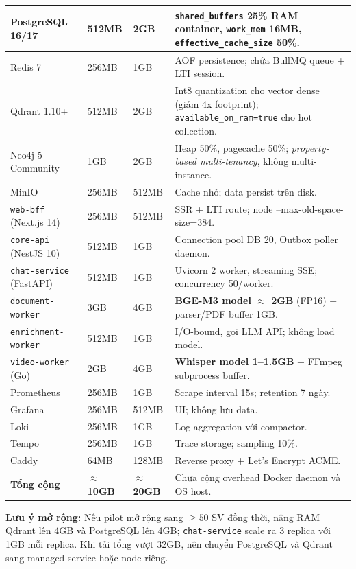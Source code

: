 \begin{longtable}{|p{3.7cm}|p{1.5cm}|p{1.8cm}|p{6cm}|}
PostgreSQL 16/17 & 512MB & 2GB
    & \texttt{shared\_buffers} 25\% RAM container, \texttt{work\_mem}
      16MB, \texttt{effective\_cache\_size} 50\%. \\
\hline
Redis 7 & 256MB & 1GB
    & AOF persistence; chứa BullMQ queue + LTI session. \\
\hline
Qdrant 1.10+ & 512MB & 2GB
    & Int8 quantization cho vector dense (giảm 4x footprint);
      \texttt{available\_on\_ram=true} cho hot collection. \\
\hline
Neo4j 5 Community & 1GB & 2GB
    & Heap 50\%, pagecache 50\%; \textit{property-based
      multi-tenancy}, không multi-instance. \\
\hline
MinIO & 256MB & 512MB & Cache nhỏ; data persist trên disk. \\
\hline
\texttt{web-bff} (Next.js 14) & 256MB & 512MB
    & SSR + LTI route; node --max-old-space-size=384. \\
\hline
\texttt{core-api} (NestJS 10) & 512MB & 1GB
    & Connection pool DB 20, Outbox poller daemon. \\
\hline
\texttt{chat-service} (FastAPI) & 512MB & 1GB
    & Uvicorn 2 worker, streaming SSE; concurrency 50/worker. \\
\hline
\texttt{document-worker} & 3GB & 4GB
    & \textbf{BGE-M3 model $\approx$ 2GB} (FP16) + parser/PDF buffer
      1GB. \\
\hline
\texttt{enrichment-worker} & 512MB & 1GB
    & I/O-bound, gọi LLM API; không load model. \\
\hline
\texttt{video-worker} (Go) & 2GB & 4GB
    & \textbf{Whisper model 1--1.5GB} + FFmpeg subprocess buffer. \\
\hline
Prometheus & 256MB & 1GB & Scrape interval 15s; retention 7 ngày. \\
\hline
Grafana & 256MB & 512MB & UI; không lưu data. \\
\hline
Loki & 256MB & 1GB & Log aggregation với compactor. \\
\hline
Tempo & 256MB & 1GB & Trace storage; sampling 10\%. \\
\hline
Caddy & 64MB & 128MB & Reverse proxy + Let's Encrypt ACME. \\
\hline
\textbf{Tổng cộng} & \textbf{$\approx$10GB} & \textbf{$\approx$20GB}
    & Chưa cộng overhead Docker daemon và OS host. \\
\hline
\end{longtable}

\textbf{Lưu ý mở rộng:} Nếu pilot mở rộng sang $\geq 50$ SV đồng thời,
nâng RAM Qdrant lên 4GB và PostgreSQL lên 4GB; \texttt{chat-service}
scale ra 3 replica với 1GB mỗi replica. Khi tải tổng vượt 32GB, nên
chuyển PostgreSQL và Qdrant sang managed service hoặc node riêng.

